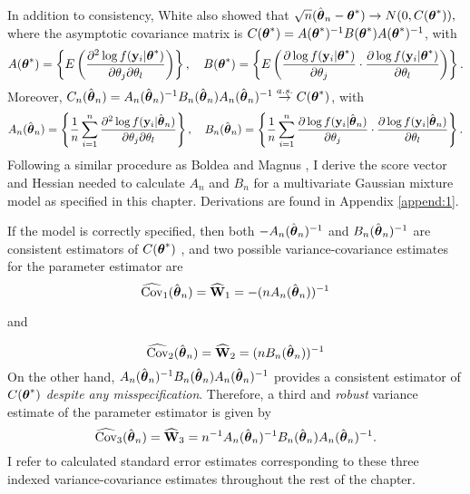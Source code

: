 In addition to consistency, White \cite{white1982} also showed that $\sqrt{n}(\hat{\boldsymbol\theta}_{n}-\boldsymbol\theta^{*})\rightarrow N(0, C(\boldsymbol\theta^{*})),$ where the asymptotic covariance matrix is
$C(\boldsymbol\theta^{*})=A(\boldsymbol\theta^{*})^{-1}B(\boldsymbol\theta^{*})A(\boldsymbol\theta^{*})^{-1}$, with
$$A(\boldsymbol\theta^{*})=\left\{E\left(\frac{\partial^{2}\log f(\mathbf y_{i}|\boldsymbol\theta^{*})}{\partial \theta_{j}\partial\theta_{l}}\right)\right\},\quad B(\boldsymbol\theta^{*})=\left\{E\left(\frac{\partial\log f(\mathbf y_{i}|\boldsymbol\theta^{*})}{\partial \theta_{j}}\cdot \frac{\partial\log f(\mathbf y_{i}|\boldsymbol\theta^{*})}{\partial \theta_{l}}\right)\right\}.$$
Moreover, $C_{n}(\hat{\boldsymbol\theta}_{n})=A_{n}(\hat{\boldsymbol\theta}_{n})^{-1}B_{n}(\hat{\boldsymbol\theta}_{n})A_{n}(\hat{\boldsymbol\theta}_{n})^{-1}\stackrel{a.s.}{\rightarrow} C(\boldsymbol\theta^{*})$, with
$$A_{n}(\hat{\boldsymbol\theta}_{n})=\left\{\frac{1}{n}\sum^{n}_{i=1}\frac{\partial^{2}\log f(\mathbf y_{i}|\hat{\boldsymbol\theta}_{n})}{\partial \theta_{j}\partial\theta_{l}}\right\},\quad B_{n}(\hat{\boldsymbol\theta}_{n})=\left\{\frac{1}{n}\sum^{n}_{i=1}\frac{\partial\log f(\mathbf y_{i}|\hat{\boldsymbol\theta}_{n})}{\partial \theta_{j}}\cdot \frac{\partial\log f(\mathbf y_{i}|\hat{\boldsymbol\theta}_{n})}{\partial \theta_{l}}\right\}.$$
 Following a similar procedure as Boldea and Magnus \cite{boldea2009}, I derive the score vector and Hessian needed to calculate $A_{n}$ and $B_{n}$ for a multivariate Gaussian mixture model as specified in this chapter. Derivations are found in Appendix \ref{append:1}.
 
If the model is correctly specified, then both $-A_{n}(\hat{\boldsymbol\theta}_{n})^{-1}$ and $B_{n}(\hat{\boldsymbol\theta}_{n})^{-1}$ are consistent estimators of $C(\boldsymbol\theta^{*})$ \cite{white1982}, and two possible variance-covariance estimates for the parameter estimator are
$$\widehat{\text{Cov}}_{1}(\hat{\boldsymbol\theta}_{n}) = \widehat{\mathbf W}_{1}=-(nA_{n}(\hat{\boldsymbol\theta}_{n}))^{-1}$$
\begin{center}and\end{center}
$$\widehat{\text{Cov}}_{2}(\hat{\boldsymbol\theta}_{n})= \widehat{\mathbf W}_{2}=(nB_{n}(\hat{\boldsymbol\theta}_{n}))^{-1}$$
On the other hand, $A_{n}(\hat{\boldsymbol\theta}_{n})^{-1}B_{n}(\hat{\boldsymbol\theta}_{n})A_{n}(\hat{\boldsymbol\theta}_{n})^{-1}$ provides a consistent estimator of $C(\boldsymbol\theta^{*})$ {\em despite any misspecification}. Therefore, a third and {\em robust} variance estimate of the parameter estimator is given by
$$\widehat{\text{Cov}}_{3}(\hat{\boldsymbol\theta}_{n})= \widehat{\mathbf W}_{3}=n^{-1}A_{n}(\hat{\boldsymbol\theta}_{n})^{-1}B_{n}(\hat{\boldsymbol\theta}_{n})A_{n}(\hat{\boldsymbol\theta}_{n})^{-1}.$$
 I refer to calculated standard error estimates corresponding to these three indexed variance-covariance estimates throughout the rest of the chapter.
 
